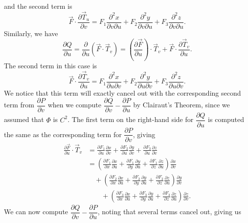 and the second term is
\[
 \vec{F}\cdot \frac{\partial \vec{T}_u}{\partial v} = F_1\frac{\partial^2x}{\partial v\partial u}+F_2\frac{\partial^2y}{\partial v\partial u}+F_3\frac{\partial^2z}{\partial v\partial u}.
\]
Similarly, we have
\[
 \frac{\partial Q}{\partial u} = \frac{\partial}{\partial u}\left(\vec{F}\cdot \vec{T}_v\right) = \left(\frac{\partial \vec{F}}{\partial u}\right)\cdot \vec{T}_v+\vec{F}\cdot \frac{\partial \vec{T}_v}{\partial u}.
\]
The second term in this case is
\[
 \vec{F}\cdot \frac{\partial \vec{T}_v}{\partial u} = F_1\frac{\partial^2x}{\partial u\partial v}+F_2\frac{\partial^2y}{\partial u\partial v}+F_3\frac{\partial^2z}{\partial u\partial v}.
\]
We notice that this term will exactly cancel out with the corresponding second term from $\dfrac{\partial P}{\partial v}$ when we compute $\dfrac{\partial Q}{\partial v}-\dfrac{\partial P}{\partial u}$ by Clairaut's Theorem, since we assumed that $\Phi$ is $C^2$. The first term on the right-hand side for $\dfrac{\partial Q}{\partial u}$ is computed the same as the corresponding term for $\dfrac{\partial P}{\partial v}$, giving
\begin{align*}
 \frac{\partial \vec{F}}{\partial u}\cdot \vec{T}_v & = \frac{\partial F_1}{\partial u}\frac{\partial x}{\partial v}+\frac{\partial F_2}{\partial u}\frac{\partial y}{\partial v}+\frac{\partial F_3}{\partial u}\frac{\partial z}{\partial v}\\
& = \left(\frac{\partial F_1}{\partial x}\frac{\partial x}{\partial u}+\frac{\partial F_1}{\partial y}\frac{\partial y}{\partial u}+\frac{\partial F_1}{\partial z}\frac{\partial z}{\partial u}\right)\frac{\partial x}{\partial v}\\
& \quad + \left(\frac{\partial F_2}{\partial x}\frac{\partial x}{\partial u}+\frac{\partial F_2}{\partial y}\frac{\partial y}{\partial u}+\frac{\partial F_2}{\partial z}\frac{\partial z}{\partial u}\right)\frac{\partial y}{\partial v}\\
& \quad\quad +\left(\frac{\partial F_3}{\partial x}\frac{\partial x}{\partial u}+\frac{\partial F_3}{\partial y}\frac{\partial y}{\partial u}+\frac{\partial F_3}{\partial z}\frac{\partial z}{\partial u}\right)\frac{\partial z}{\partial v}.
\end{align*}
We can now compute $\dfrac{\partial Q}{\partial v}-\dfrac{\partial P}{\partial u}$, noting that several terms cancel out, giving us
